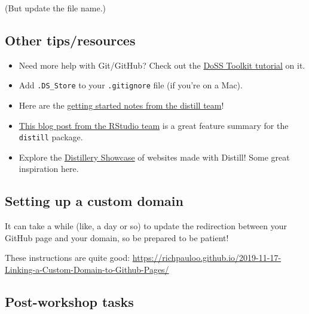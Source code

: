 \documentclass[
]{article}
\providecommand{\tightlist}{%
  \setlength{\itemsep}{0pt}\setlength{\parskip}{0pt}}
\begin{document}
(But update the file name.)

\hypertarget{other-tipsresources}{%
\subsection{Other tips/resources}\label{other-tipsresources}}

\begin{itemize}
\tightlist
\item
  Need more help with Git/GitHub? Check out the \href{https://dosstoolkit.com/}{DoSS Toolkit tutorial} on it.
\item
  Add \texttt{.DS\_Store} to your \texttt{.gitignore} file (if you're on a Mac).
\item
  Here are the \href{https://rstudio.github.io/distill/website.html}{getting started notes from the distill team}!
\item
  \href{https://blog.rstudio.com/2020/12/07/distill/}{This blog post from the RStudio team} is a great feature summary for the \texttt{distill} package.
\item
  Explore the \href{https://distillery.rbind.io/showcase.html}{Distillery Showcase} of websites made with Distill! Some great inspiration here.
\end{itemize}

\hypertarget{setting-up-a-custom-domain}{%
\subsection{Setting up a custom domain}\label{setting-up-a-custom-domain}}

It can take a while (like, a day or so) to update the redirection between your GitHub page and your domain, so be prepared to be patient!

These instructions are quite good: \url{https://richpauloo.github.io/2019-11-17-Linking-a-Custom-Domain-to-Github-Pages/}

\hypertarget{post-workshop-tasks}{%
\subsection{Post-workshop tasks}\label{post-workshop-tasks}}
\end{document}

